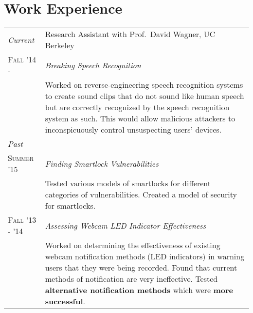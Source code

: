 \documentclass[letter,10pt]{article}
\begin{document}
\section{Work Experience}
\begin{tabular}{R{2.5cm}p{13cm}}
  \emph{Current}          & Research Assistant with Prof.\ David Wagner, UC Berkeley\\


  \textsc{Fall '14 -}     & \emph{Breaking Speech Recognition}\\

                          &\footnotesize{
                             Worked on reverse-engineering speech recognition
                             systems to create sound clips that do not sound
                             like human speech but are correctly recognized by
                             the speech recognition system as such. This would
                             allow malicious attackers to inconspicuously
                             control unsuspecting users’ devices.
                            }\\



  \emph{Past}             &\\
  \textsc{Summer '15}     & \emph{Finding Smartlock Vulnerabilities}\\

                          &\footnotesize{
                             Tested various models of smartlocks for different
                             categories of vulnerabilities. Created a model of
                             security for smartlocks.
                          
                            }\\
  \textsc{Fall '13 - '14} & \emph{Assessing Webcam LED Indicator Effectiveness}\\

                          &\footnotesize{
                             Worked on determining the effectiveness of
                             existing webcam notification methods (LED
                             indicators) in warning users that they were being
                             recorded. Found that current methods of
                             notification are very ineffective. Tested
                             \textbf{alternative notification methods} which
                             were \textbf{more successful}.

                            }\\


\end{tabular}
\end{document}
